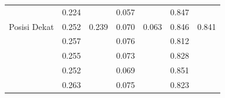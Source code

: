 \documentclass[conference]{IEEEtran}
\begin{document}
\begin{table}[]
\begin{tabular}{|l|cc|cc|cc|}
                                                      & \multicolumn{1}{c|}{\cellcolor[HTML]{FFFFFF}0.224} & \cellcolor[HTML]{FFFFFF}                         & \multicolumn{1}{c|}{\cellcolor[HTML]{FFFFFF}0.057}  & \cellcolor[HTML]{FFFFFF}                           & \multicolumn{1}{c|}{\cellcolor[HTML]{FFFFFF}0.847} & \cellcolor[HTML]{FFFFFF}                        \\ \cline{2-2} \cline{4-4} \cline{6-6}
  \multirow{-5}{*}{Posisi Dekat}                & \multicolumn{1}{c|}{\cellcolor[HTML]{FFFFFF}0.252} & \multirow{-5}{*}{\cellcolor[HTML]{FFFFFF}0.239} & \multicolumn{1}{c|}{\cellcolor[HTML]{FFFFFF}0.070} & \multirow{-5}{*}{\cellcolor[HTML]{FFFFFF}0.063} & \multicolumn{1}{c|}{\cellcolor[HTML]{FFFFFF}0.846} & \multirow{-5}{*}{\cellcolor[HTML]{FFFFFF}0.841} \\ \hline
                                                      & \multicolumn{1}{c|}{\cellcolor[HTML]{FFFFFF}0.257} & \cellcolor[HTML]{FFFFFF}                         & \multicolumn{1}{c|}{\cellcolor[HTML]{FFFFFF}0.076} & \cellcolor[HTML]{FFFFFF}                           & \multicolumn{1}{c|}{\cellcolor[HTML]{FFFFFF}0.812} & \cellcolor[HTML]{FFFFFF}                        \\ \cline{2-2} \cline{4-4} \cline{6-6}
                                                      & \multicolumn{1}{c|}{\cellcolor[HTML]{FFFFFF}0.255} & \cellcolor[HTML]{FFFFFF}                         & \multicolumn{1}{c|}{\cellcolor[HTML]{FFFFFF}0.073} & \cellcolor[HTML]{FFFFFF}                           & \multicolumn{1}{c|}{\cellcolor[HTML]{FFFFFF}0.828} & \cellcolor[HTML]{FFFFFF}                        \\ \cline{2-2} \cline{4-4} \cline{6-6}
                                                      & \multicolumn{1}{c|}{\cellcolor[HTML]{FFFFFF}0.252} & \cellcolor[HTML]{FFFFFF}                         & \multicolumn{1}{c|}{\cellcolor[HTML]{FFFFFF}0.069} & \cellcolor[HTML]{FFFFFF}                           & \multicolumn{1}{c|}{\cellcolor[HTML]{FFFFFF}0.851} & \cellcolor[HTML]{FFFFFF}                        \\ \cline{2-2} \cline{4-4} \cline{6-6}
                                                      & \multicolumn{1}{c|}{\cellcolor[HTML]{FFFFFF}0.263} & \cellcolor[HTML]{FFFFFF}                         & \multicolumn{1}{c|}{\cellcolor[HTML]{FFFFFF}0.075} & \cellcolor[HTML]{FFFFFF}                           & \multicolumn{1}{c|}{\cellcolor[HTML]{FFFFFF}0.823} & \cellcolor[HTML]{FFFFFF}                        \\ \cline{2-2} \cline{4-4} \cline{6-6}

\end{tabular}
\end{table}
\end{document}
